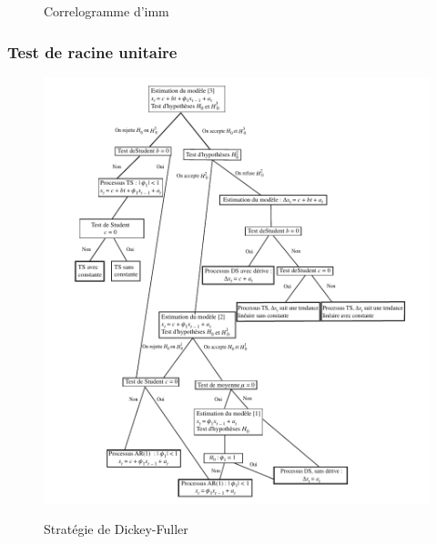 \begin{figure}[H]
    \centering
    \caption{Correlogramme d'imm}
    \label{tab:correlo_imm}
\end{figure}

\subsubsection*{Test de racine unitaire}

\begin{figure}[H]
    \centering
    \caption{Stratégie de Dickey-Fuller}
    \includegraphics[scale=1.2]{annexes/df_test.pdf}
    \label{fig:strategie}
\end{figure}

